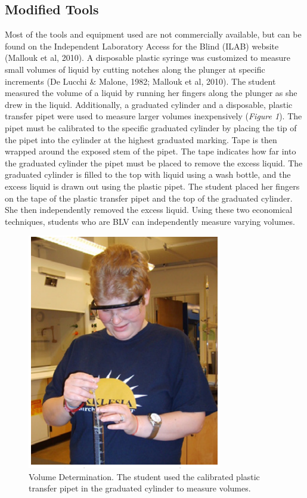 \documentclass[11.5pt]{sig-alternate} %
\begin{document}
\begin{large}
\subsection*{Modified Tools}

Most of the tools and equipment used are not commercially available, but can be found on the Independent Laboratory Access for the Blind (ILAB) website (Mallouk et al, 2010). A disposable plastic syringe was customized to measure small volumes of liquid by cutting notches along the plunger at specific increments (De Lucchi \& Malone, 1982; Mallouk et al, 2010). The student measured the volume of a liquid by running her fingers along the plunger as she drew in the liquid. Additionally, a graduated cylinder and a disposable, plastic transfer pipet were used to measure larger volumes inexpensively (\textit{Figure 1}). The pipet must be calibrated to the specific graduated cylinder by placing the tip of the pipet into the cylinder at the highest graduated marking. Tape is then wrapped around the exposed stem of the pipet. The tape indicates how far into the graduated cylinder the pipet must be placed to remove the excess liquid. The graduated cylinder is filled to the top with liquid using a wash bottle, and the excess liquid is drawn out using the plastic pipet. The student placed her fingers on the tape of the plastic transfer pipet and the top of the graduated cylinder. She then independently removed the excess liquid. Using these two economical techniques, students who are BLV can independently measure varying volumes. 

\begin{figure}[!h]
    \centering
    \includegraphics[width=0.9\linewidth]{fig1.png}
    \caption{Volume Determination. The student used the calibrated plastic transfer pipet in the graduated cylinder to measure volumes.}
\end{figure}


\end{large}
\end{document}

